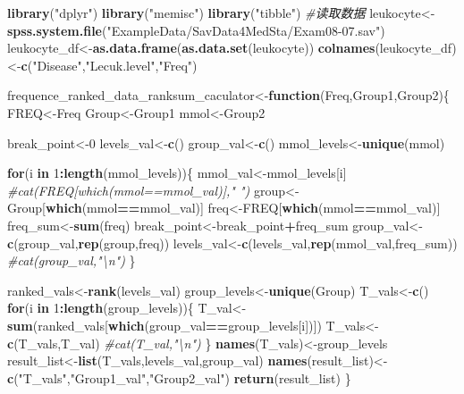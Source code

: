 \documentclass[
]{article}
\newenvironment{Shaded}{\begin{snugshade}}{\end{snugshade}}
\newcommand{\CommentTok}[1]{\textcolor[rgb]{0.56,0.35,0.01}{\textit{#1}}}
\newcommand{\ControlFlowTok}[1]{\textcolor[rgb]{0.13,0.29,0.53}{\textbf{#1}}}
\newcommand{\DecValTok}[1]{\textcolor[rgb]{0.00,0.00,0.81}{#1}}
\newcommand{\KeywordTok}[1]{\textcolor[rgb]{0.13,0.29,0.53}{\textbf{#1}}}
\newcommand{\NormalTok}[1]{#1}
\newcommand{\OperatorTok}[1]{\textcolor[rgb]{0.81,0.36,0.00}{\textbf{#1}}}
\newcommand{\StringTok}[1]{\textcolor[rgb]{0.31,0.60,0.02}{#1}}
\begin{document}
\begin{Shaded}
\begin{Highlighting}[]
\KeywordTok{library}\NormalTok{(}\StringTok{"dplyr"}\NormalTok{)}
\KeywordTok{library}\NormalTok{(}\StringTok{"memisc"}\NormalTok{)}
\KeywordTok{library}\NormalTok{(}\StringTok{"tibble"}\NormalTok{)}
\CommentTok{#读取数据}
\NormalTok{leukocyte<-}\KeywordTok{spss.system.file}\NormalTok{(}\StringTok{"ExampleData/SavData4MedSta/Exam08-07.sav"}\NormalTok{)}
\NormalTok{leukocyte_df<-}\KeywordTok{as.data.frame}\NormalTok{(}\KeywordTok{as.data.set}\NormalTok{(leukocyte))}
\KeywordTok{colnames}\NormalTok{(leukocyte_df)<-}\KeywordTok{c}\NormalTok{(}\StringTok{"Disease"}\NormalTok{,}\StringTok{"Lecuk.level"}\NormalTok{,}\StringTok{"Freq"}\NormalTok{)}

\NormalTok{frequence_ranked_data_ranksum_caculator<-}\ControlFlowTok{function}\NormalTok{(Freq,Group1,Group2)\{}
\NormalTok{   FREQ<-Freq}
\NormalTok{   Group<-Group1}
\NormalTok{   mmol<-Group2}

\NormalTok{   break_point<-}\DecValTok{0}
\NormalTok{   levels_val<-}\KeywordTok{c}\NormalTok{()}
\NormalTok{   group_val<-}\KeywordTok{c}\NormalTok{()}
\NormalTok{   mmol_levels<-}\KeywordTok{unique}\NormalTok{(mmol)}

   \ControlFlowTok{for}\NormalTok{(i }\ControlFlowTok{in} \DecValTok{1}\OperatorTok{:}\KeywordTok{length}\NormalTok{(mmol_levels))\{}
\NormalTok{      mmol_val<-mmol_levels[i]}
      \CommentTok{#cat(FREQ[which(mmol==mmol_val)],"   ")}
\NormalTok{      group<-Group[}\KeywordTok{which}\NormalTok{(mmol}\OperatorTok{==}\NormalTok{mmol_val)]}
\NormalTok{      freq<-FREQ[}\KeywordTok{which}\NormalTok{(mmol}\OperatorTok{==}\NormalTok{mmol_val)]}
\NormalTok{      freq_sum<-}\KeywordTok{sum}\NormalTok{(freq)}
\NormalTok{      break_point<-break_point}\OperatorTok{+}\NormalTok{freq_sum}
\NormalTok{      group_val<-}\KeywordTok{c}\NormalTok{(group_val,}\KeywordTok{rep}\NormalTok{(group,freq))}
\NormalTok{      levels_val<-}\KeywordTok{c}\NormalTok{(levels_val,}\KeywordTok{rep}\NormalTok{(mmol_val,freq_sum))}
      \CommentTok{#cat(group_val,"\textbackslash{}n")}
\NormalTok{   \}}
   
\NormalTok{   ranked_vals<-}\KeywordTok{rank}\NormalTok{(levels_val)}
\NormalTok{   group_levels<-}\KeywordTok{unique}\NormalTok{(Group)}
\NormalTok{   T_vals<-}\KeywordTok{c}\NormalTok{()}
   \ControlFlowTok{for}\NormalTok{(i }\ControlFlowTok{in} \DecValTok{1}\OperatorTok{:}\KeywordTok{length}\NormalTok{(group_levels))\{}
\NormalTok{      T_val<-}\KeywordTok{sum}\NormalTok{(ranked_vals[}\KeywordTok{which}\NormalTok{(group_val}\OperatorTok{==}\NormalTok{group_levels[i])])}
\NormalTok{      T_vals<-}\KeywordTok{c}\NormalTok{(T_vals,T_val)}
      \CommentTok{#cat(T_val,"\textbackslash{}n")}
\NormalTok{   \}}
   \KeywordTok{names}\NormalTok{(T_vals)<-group_levels}
\NormalTok{   result_list<-}\KeywordTok{list}\NormalTok{(T_vals,levels_val,group_val)}
   \KeywordTok{names}\NormalTok{(result_list)<-}\KeywordTok{c}\NormalTok{(}\StringTok{"T_vals"}\NormalTok{,}\StringTok{"Group1_val"}\NormalTok{,}\StringTok{"Group2_val"}\NormalTok{)}
   \KeywordTok{return}\NormalTok{(result_list)}
\NormalTok{\}}


\end{Highlighting}
\end{Shaded}
\end{document}
